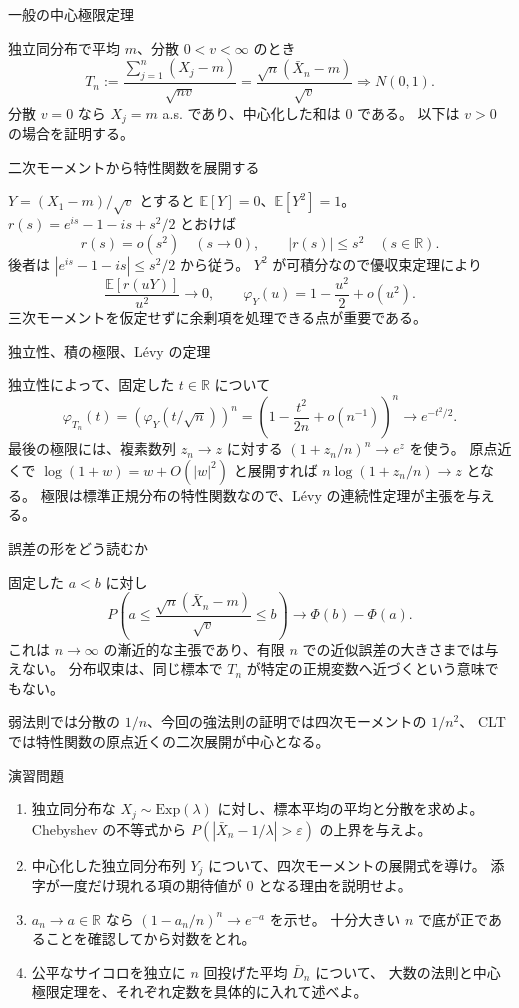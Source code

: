 \documentclass[a4paper,10pt,pdflatex,ja=standard,jafont=ipaex-type1,
  magstyle=real,scale=1]{bxjsarticle}
\newcommand{\topic}[1]{\par\vspace{5pt}
  {\large\sffamily\mdseries\color{accent}#1}\par\vspace{2pt}}
\newcommand{\keybox}[1]{\par\vspace{3pt}\begingroup
  \setlength{\fboxsep}{5pt}
  \colorbox{soft}{\parbox{\dimexpr\linewidth-2\fboxsep\relax}{#1}}%
  \endgroup\par\vspace{2pt}}
\newcommand{\R}{\mathbb R}
\newcommand{\E}{\mathbb E}
\begin{document}
\newpage
\topic{一般の中心極限定理}
独立同分布で平均 $m$、分散 $0<v<\infty$ のとき
$$T_n:=\frac{\sum_{j=1}^n(X_j-m)}{\sqrt{nv}}
 =\frac{\sqrt n(\bar X_n-m)}{\sqrt v}\Rightarrow N(0,1).$$
分散 $v=0$ なら $X_j=m$ a.s. であり、中心化した和は $0$ である。
以下は $v>0$ の場合を証明する。

\topic{二次モーメントから特性関数を展開する}
$Y=(X_1-m)/\sqrt v$ とすると $\E[Y]=0$、$\E[Y^2]=1$。
$r(s)=e^{is}-1-is+s^2/2$ とおけば
$$r(s)=o(s^2)\quad(s\to0),\qquad |r(s)|\le s^2\quad(s\in\R).$$
後者は $|e^{is}-1-is|\le s^2/2$ から従う。
$Y^2$ が可積分なので優収束定理により
$$\frac{\E[r(uY)]}{u^2}\longrightarrow0,\qquad
 \varphi_Y(u)=1-\frac{u^2}2+o(u^2).$$
三次モーメントを仮定せずに余剰項を処理できる点が重要である。

\topic{独立性、積の極限、L\'evy の定理}
独立性によって、固定した $t\in\R$ について
$$\varphi_{T_n}(t)=\left(\varphi_Y(t/\sqrt n)\right)^n
 =\left(1-\frac{t^2}{2n}+o(n^{-1})\right)^n\longrightarrow e^{-t^2/2}.$$
最後の極限には、複素数列 $z_n\to z$ に対する
$\left(1+z_n/n\right)^n\to e^z$ を使う。
原点近くで $\log(1+w)=w+O(|w|^2)$ と展開すれば
$n\log(1+z_n/n)\to z$ となる。
極限は標準正規分布の特性関数なので、L\'evy の連続性定理が主張を与える。

\topic{誤差の形をどう読むか}
固定した $a<b$ に対し
$$P\left(a\le\frac{\sqrt n(\bar X_n-m)}{\sqrt v}\le b\right)
 \longrightarrow\Phi(b)-\Phi(a).$$
これは $n\to\infty$ の漸近的な主張であり、有限 $n$ での近似誤差の大きさまでは与えない。
分布収束は、同じ標本で $T_n$ が特定の正規変数へ近づくという意味でもない。

\keybox{弱法則では分散の $1/n$、今回の強法則の証明では四次モーメントの $1/n^2$、
CLT では特性関数の原点近くの二次展開が中心となる。}

\newpage
\topic{演習問題}
\begin{enumerate}[label=\arabic*.]
\item 独立同分布な $X_j\sim\mathrm{Exp}(\lambda)$ に対し、標本平均の平均と分散を求めよ。
Chebyshev の不等式から $P(|\bar X_n-1/\lambda|>\varepsilon)$ の上界を与えよ。
\item 中心化した独立同分布列 $Y_j$ について、四次モーメントの展開式を導け。
添字が一度だけ現れる項の期待値が $0$ となる理由を説明せよ。
\item $a_n\to a\in\R$ なら $(1-a_n/n)^n\to e^{-a}$ を示せ。
十分大きい $n$ で底が正であることを確認してから対数をとれ。
\item 公平なサイコロを独立に $n$ 回投げた平均 $\bar D_n$ について、
大数の法則と中心極限定理を、それぞれ定数を具体的に入れて述べよ。
\end{enumerate}
\end{document}
